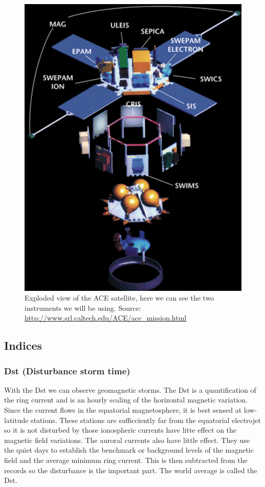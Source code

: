 \documentclass[norsk,a4paper,11pt]{article}
\begin{document}
\begin{multicols}{2}
	\begin{figure}[H]
		\includegraphics[scale=0.5]{Figures/ace_exploded.png}
		\centering
		\caption{Exploded view of the ACE satellite, here we can see the two instruments we will be using. Source: \url{http://www.srl.caltech.edu/ACE/ace_mission.html}}
		\label{fig:ace_exploded}
	\end{figure}

\subsection{Indices} %
\label{sub:indices}

\subsubsection{Dst (Disturbance storm time)} %
\label{sub:Dst}
With the Dst we can observe geomagnetic storms. The Dst is a quantification of the ring current and is an hourly scaling of the horizontal magnetic variation. Since the current flows in the equatorial magnetosphere, it is best sensed at low-latitude stations. These stations are sufficciently far from the equatorial electrojet so it is not disturbed by those ionospheric currents have litte effect on the magnetic field variations. The auroral currents also have little effect. They use the quiet days to establish the benchmark or background levels of the magnetic field and the average minimum ring current. This is then subtracted from the records so the disturbance is the important part. The world average is called the Dst. 


\end{multicols}
\end{document}
